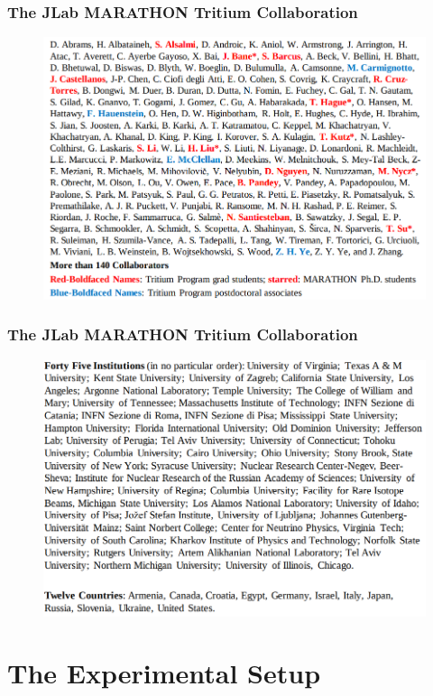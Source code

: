 \documentclass[12pt,usenames,dvipsnames]{beamer}
\begin{document}
\begin{frame}
\frametitle{The JLab MARATHON Tritium Collaboration}
\vspace{-15pt}

\begin{figure}
	\includegraphics[width =11.5cm]{../images/collabos_ppl.png}
\end{figure}

\end{frame}

\begin{frame}
\frametitle{The JLab MARATHON Tritium Collaboration}
\vspace{-15pt}

\begin{figure}
\includegraphics[width =11.5cm]{../images/callabos_un.png}
\end{figure}

\end{frame}
\section[Experiment]{The Experimental Setup}
\end{document}
